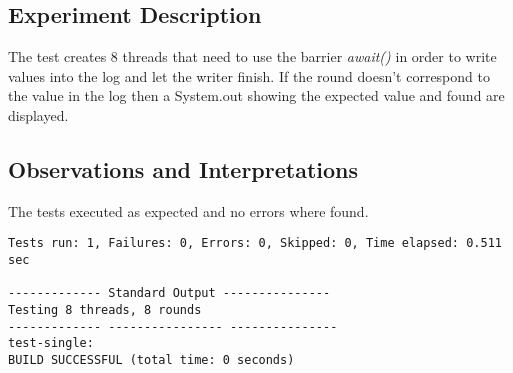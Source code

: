 \subsection{Experiment Description} 
\par
The test creates $8$ threads that need to use the barrier \textit{await()} in order to write values into the log and let the writer finish. 
If the round doesn't correspond to the value in the log then a System.out showing the expected value and found are displayed.
\par



\subsection{Observations and Interpretations}

\par
The tests executed as expected and no errors where found.
\begin{lstlisting}[frame=single,breaklines=true]
Tests run: 1, Failures: 0, Errors: 0, Skipped: 0, Time elapsed: 0.511 sec

------------- Standard Output ---------------
Testing 8 threads, 8 rounds
------------- ---------------- ---------------
test-single:
BUILD SUCCESSFUL (total time: 0 seconds)
\end{lstlisting}




